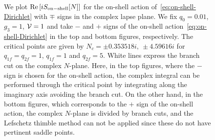 \documentclass[superscriptaddress,aps,preprintnumbers,nofootinbib]{revtex4-2}
\begin{document}
\begin{figure}[t]
%
 \caption{We plot $\textrm{Re}\left[iS_{\rm on-shell}[N]\right]$ for the on-shell action of~\eqref{eq:on-shell-Dirichlet} with $\mp$ signs in the complex lapse plane. We fix $q_{0}=0.01$, $g_3=1$, ${\cal V}=1$ and take $-$ and $+$ signs of the on-shell action~\eqref{eq:on-shell-Dirichlet} in the top and bottom figures, respectively. The critical points are given by $N_c=\pm 0.353518 i, \ \pm 4.59616i$ for $q_{1f}=q_{2f}=1$, $q_{1f}=1$ and $q_{2f}=5$.  White lines express the branch cut on the complex $N$-plane. Here, in the top figures, where the $-$ sign is chosen for the on-shell action, the complex integral can be performed through the critical point by integrating along the imaginary axis avoiding the branch cut. On the other hand, in the bottom figures, which corresponds to the $+$ sign of the on-shell action, the complex $N$-plane is divided by branch cuts, and the Lefschetz thimble method can not be applied since these do not have pertinent saddle points.}
\label{fig:Picard-Lefschetz1}
\end{figure}
\end{document}
